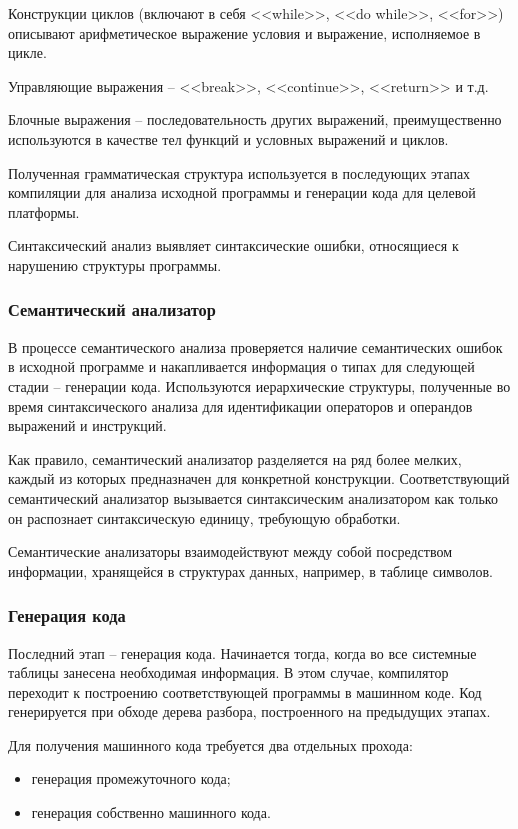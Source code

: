 Конструкции циклов (включают в себя <<while>>, <<do while>>, <<for>>) описывают арифметическое выражение условия и выражение, исполняемое в цикле.

Управляющие выражения -- <<break>>, <<continue>>, <<return>> и т.д. 

Блочные выражения -- последовательность других выражений, преимущественно используются в качестве тел функций и условных выражений и циклов.

Полученная грамматическая структура используется в последующих этапах компиляции для анализа исходной программы и генерации кода для целевой платформы. 

Синтаксический анализ выявляет синтаксические ошибки, относящиеся к нарушению структуры программы. \\

\subsubsection{Семантический анализатор}
В процессе семантического анализа проверяется наличие семантических ошибок в исходной программе и накапливается информация о типах для следующей стадии -- генерации кода. Используются иерархические структуры, полученные во время синтаксического анализа для идентификации операторов и операндов выражений и инструкций. 

Как правило, семантический анализатор разделяется на ряд более мелких, каждый из которых предназначен для конкретной конструкции. Соответствующий семантический анализатор вызывается синтаксическим анализатором как только он распознает синтаксическую единицу, требующую обработки.

Семантические анализаторы взаимодействуют между собой посредством информации, хранящейся в структурах данных, например, в таблице символов.

\subsubsection{Генерация кода}
Последний этап -- генерация кода. Начинается тогда, когда во все системные таблицы занесена необходимая информация. В этом случае, компилятор переходит к построению соответствующей программы в машинном коде. Код генерируется при обходе дерева разбора, построенного на предыдущих этапах. 

Для получения машинного кода требуется два отдельных прохода:
\begin{itemize}
	\item генерация промежуточного кода;
	
	\item генерация собственно машинного кода.
\end{itemize}

